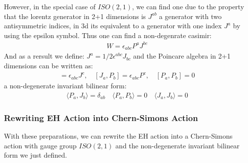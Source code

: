 However, in the special case of $ISO(2,1)$, we can find one due to the
property that the lorentz generator in 2+1 dimensions is $ J^{ab} $ a
generator with two antisymmetric indices, in 3d its equivalent to a
generator with one index $ J^a $ by using the epsilon symbol. Thus
one can find a non-degenrate casimir:
\begin{align}
  W = \epsilon_{abc} P^a J^{bc}
\end{align}
And as a rersult we define: $ J^a = 1/2 \epsilon^{abc} J_{bc} $ and
the Poincare algebra in 2+1 dimensions can be written as:
\begin{align}
  [J_a, J_b] = \epsilon_{abc} J^c, \quad [J_a, P_b] = \epsilon_{abc} P^c, \quad
  [P_a, P_b] = 0
\end{align}
a non-degenerate invariant bilinear form:
\begin{align}
  \langle P_a, J_b \rangle = \delta_{ab} \quad \langle P_a, P_b
  \rangle = 0 \quad \langle J_a, J_b \rangle = 0
\end{align}

\subsubsection{Rewriting EH Action into Chern-Simons Action}

With these preparations, we can rewrite the EH action into a
Chern-Simons action with gauge group $ ISO(2,1) $ and the
non-degenerate invariant
bilinear form we just defined.

